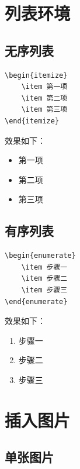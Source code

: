 \documentclass[10pt,openany]{book}
\begin{document}
\section{列表环境}

\subsection{无序列表}

\begin{lstlisting}[style=pythonstyle]
\begin{itemize}
    \item 第一项
    \item 第二项
    \item 第三项
\end{itemize}
\end{lstlisting}

效果如下：
\begin{itemize}
    \item 第一项
    \item 第二项
    \item 第三项
\end{itemize}

\subsection{有序列表}

\begin{lstlisting}[style=pythonstyle]
\begin{enumerate}
    \item 步骤一
    \item 步骤二
    \item 步骤三
\end{enumerate}
\end{lstlisting}

效果如下：
\begin{enumerate}
    \item 步骤一
    \item 步骤二
    \item 步骤三
\end{enumerate}

\section{插入图片}

\subsection{单张图片}
\end{document}
